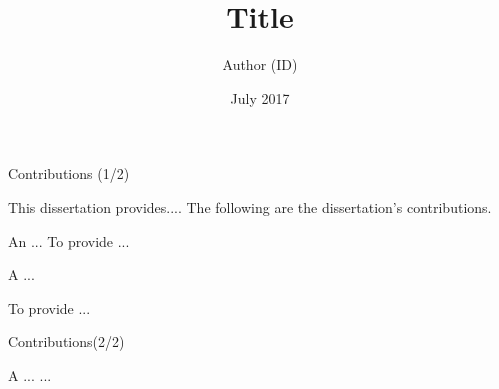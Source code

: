 \documentclass[12pt,t]{beamer}
\begin{document}
\author{{Author} (ID)}
\title[Final Review]{Title} %

 

\date{July 2017}


\begin{frame}[plain]
    \titlepage
   
\end{frame}


\begin{frame}{Contributions (1/2)}


This dissertation provides.... The following are the dissertation's contributions.

\begin{block}{ An ...}
    To provide ... 
    
\end{block}

\begin{block}{ A ...}

To provide ...
\end{block}

\end{frame}
\begin{frame}{Contributions(2/2)}
\begin{block}{ A ...}
...
\end{block}
\end{frame}
\end{document}

